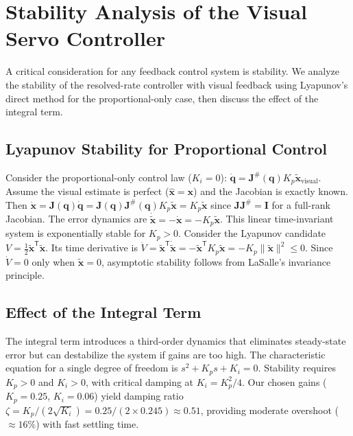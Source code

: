 \documentclass[12pt,a4paper,oneside]{report}
\begin{document}
\section{Stability Analysis of the Visual Servo Controller}

A critical consideration for any feedback control system is stability. We analyze the stability of the resolved-rate controller with visual feedback using Lyapunov's direct method for the proportional-only case, then discuss the effect of the integral term.

\subsection{Lyapunov Stability for Proportional Control}

Consider the proportional-only control law ($K_i = 0$): $\dot{\mathbf{q}} = \mathbf{J}^{\#}(\mathbf{q}) K_p \tilde{\mathbf{x}}_{\text{visual}}$. Assume the visual estimate is perfect ($\hat{\mathbf{x}} = \mathbf{x}$) and the Jacobian is exactly known. Then $\dot{\mathbf{x}} = \mathbf{J}(\mathbf{q}) \dot{\mathbf{q}} = \mathbf{J}(\mathbf{q}) \mathbf{J}^{\#}(\mathbf{q}) K_p \tilde{\mathbf{x}} = K_p \tilde{\mathbf{x}}$ since $\mathbf{J} \mathbf{J}^{\#} = \mathbf{I}$ for a full-rank Jacobian. The error dynamics are $\dot{\tilde{\mathbf{x}}} = -\dot{\mathbf{x}} = -K_p \tilde{\mathbf{x}}$. This linear time-invariant system is exponentially stable for $K_p > 0$. Consider the Lyapunov candidate $V = \frac{1}{2} \tilde{\mathbf{x}}^{\mathsf{T}} \tilde{\mathbf{x}}$. Its time derivative is $\dot{V} = \tilde{\mathbf{x}}^{\mathsf{T}} \dot{\tilde{\mathbf{x}}} = -\tilde{\mathbf{x}}^{\mathsf{T}} K_p \tilde{\mathbf{x}} = -K_p \|\tilde{\mathbf{x}}\|^2 \leq 0$. Since $\dot{V} = 0$ only when $\tilde{\mathbf{x}} = 0$, asymptotic stability follows from LaSalle's invariance principle.

\subsection{Effect of the Integral Term}

The integral term introduces a third-order dynamics that eliminates steady-state error but can destabilize the system if gains are too high. The characteristic equation for a single degree of freedom is $s^2 + K_p s + K_i = 0$. Stability requires $K_p > 0$ and $K_i > 0$, with critical damping at $K_i = K_p^2/4$. Our chosen gains ($K_p = 0.25$, $K_i = 0.06$) yield damping ratio $\zeta = K_p / (2\sqrt{K_i}) = 0.25 / (2 \times 0.245) \approx 0.51$, providing moderate overshoot ($\approx 16\%$) with fast settling time.
\end{document}
